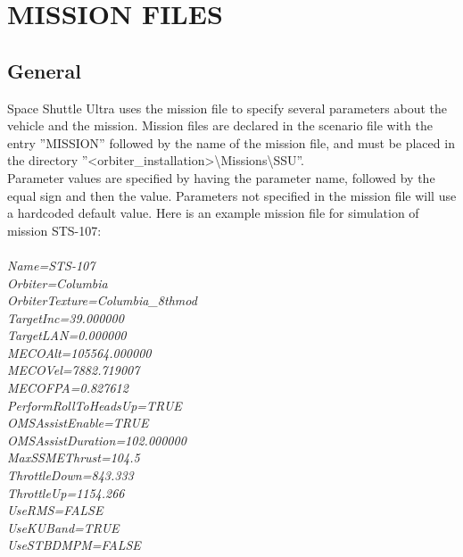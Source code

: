 \documentclass[Space_Shuttle_Ultra_Manual.tex]{subfiles}
\begin{document}
\section{MISSION FILES}
\begin{multicols*}{2}
\label{sec:mission-files}
\renewcommand{\cfttoctitlefont}{\bf}
\localtableofcontents
\end{multicols*}

\subsection{General}
\begin{multicols*}{2}
\noindent
Space Shuttle Ultra uses the mission file to specify several parameters about the vehicle and the mission. Mission files are declared in the scenario file with the entry ''MISSION'' followed by the name of the mission file, and must be placed in the directory ''<orbiter\_installation>\textbackslash Missions\textbackslash SSU''.
\\
Parameter values are specified by having the parameter name, followed by the equal sign and then the value. Parameters not specified in the mission file will use a hardcoded default value. Here is an example mission file for simulation of mission STS-107$\colon$
\\
\\
\textit{Name=STS-107}
\\
\textit{Orbiter=Columbia}
\\
\textit{OrbiterTexture=Columbia\_8thmod}
\\
\textit{TargetInc=39.000000}
\\
\textit{TargetLAN=0.000000}
\\
\textit{MECOAlt=105564.000000}
\\
\textit{MECOVel=7882.719007}
\\
\textit{MECOFPA=0.827612}
\\
\textit{PerformRollToHeadsUp=TRUE}
\\
\textit{OMSAssistEnable=TRUE}
\\
\textit{OMSAssistDuration=102.000000}
\\
\textit{MaxSSMEThrust=104.5}
\\
\textit{ThrottleDown=843.333}
\\
\textit{ThrottleUp=1154.266}
\\
\textit{UseRMS=FALSE}
\\
\textit{UseKUBand=TRUE}
\\
\textit{UseSTBDMPM=FALSE}
\\

\end{multicols*}
\end{document}
